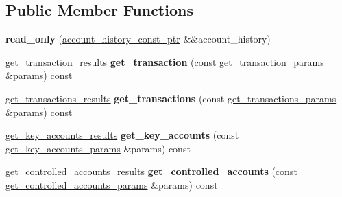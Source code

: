 \subsection*{Public Member Functions}
\begin{DoxyCompactItemize}
\item 
\mbox{\label{classaacio_1_1account__history__apis_1_1read__only_acf9e15289b497d1727f56fa1f21df6a2}} 
{\bfseries read\+\_\+only} (\mbox{\hyperlink{classfc_1_1shared__ptr}{account\+\_\+history\+\_\+const\+\_\+ptr}} \&\&account\+\_\+history)
\item 
\mbox{\label{classaacio_1_1account__history__apis_1_1read__only_a49cc12e0dcae2e647e6fba39742333e4}} 
\mbox{\hyperlink{structaacio_1_1account__history__apis_1_1read__only_1_1get__transaction__results}{get\+\_\+transaction\+\_\+results}} {\bfseries get\+\_\+transaction} (const \mbox{\hyperlink{structaacio_1_1account__history__apis_1_1read__only_1_1get__transaction__params}{get\+\_\+transaction\+\_\+params}} \&params) const
\item 
\mbox{\label{classaacio_1_1account__history__apis_1_1read__only_a38b1c5b6bdec9eec4213788c1652ee66}} 
\mbox{\hyperlink{structaacio_1_1account__history__apis_1_1read__only_1_1get__transactions__results}{get\+\_\+transactions\+\_\+results}} {\bfseries get\+\_\+transactions} (const \mbox{\hyperlink{structaacio_1_1account__history__apis_1_1read__only_1_1get__transactions__params}{get\+\_\+transactions\+\_\+params}} \&params) const
\item 
\mbox{\label{classaacio_1_1account__history__apis_1_1read__only_ab240766be27d1f654d7b5c9a48ee75ab}} 
\mbox{\hyperlink{structaacio_1_1account__history__apis_1_1read__only_1_1get__key__accounts__results}{get\+\_\+key\+\_\+accounts\+\_\+results}} {\bfseries get\+\_\+key\+\_\+accounts} (const \mbox{\hyperlink{structaacio_1_1account__history__apis_1_1read__only_1_1get__key__accounts__params}{get\+\_\+key\+\_\+accounts\+\_\+params}} \&params) const
\item 
\mbox{\label{classaacio_1_1account__history__apis_1_1read__only_aa46c6334b3bc67a5a31cf7c5c7cf323e}} 
\mbox{\hyperlink{structaacio_1_1account__history__apis_1_1read__only_1_1get__controlled__accounts__results}{get\+\_\+controlled\+\_\+accounts\+\_\+results}} {\bfseries get\+\_\+controlled\+\_\+accounts} (const \mbox{\hyperlink{structaacio_1_1account__history__apis_1_1read__only_1_1get__controlled__accounts__params}{get\+\_\+controlled\+\_\+accounts\+\_\+params}} \&params) const
\end{DoxyCompactItemize}


